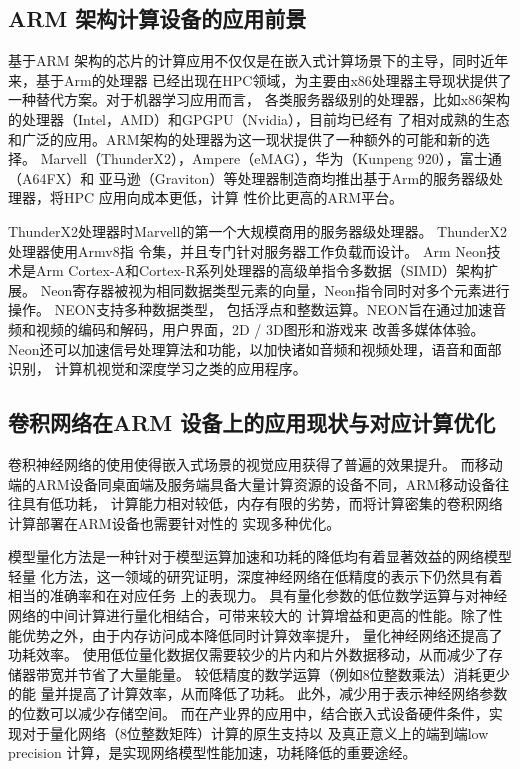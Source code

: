 \subsection{ARM 架构计算设备的应用前景}
基于ARM 架构的芯片的计算应用不仅仅是在嵌入式计算场景下的主导，同时近年来，基于Arm的处理器
已经出现在HPC领域，为主要由x86处理器主导现状提供了一种替代方案。对于机器学习应用而言，
各类服务器级别的处理器，比如x86架构的处理器（Intel，AMD）和GPGPU（Nvidia），目前均已经有
了相对成熟的生态和广泛的应用。ARM架构的处理器为这一现状提供了一种额外的可能和新的选择。
Marvell（ThunderX2），Ampere（eMAG），华为（Kunpeng 920），富士通（A64FX）和
亚马逊（Graviton）等处理器制造商均推出基于Arm的服务器级处理器，将HPC 应用向成本更低，计算
性价比更高的ARM平台。

ThunderX2处理器时Marvell的第一个大规模商用的服务器级处理器。 ThunderX2处理器使用Armv8指
令集，并且专门针对服务器工作负载而设计。 Arm Neon技术是Arm Cortex-A和Cortex-R系列处理器的高级单指令多数据（SIMD）架构扩展。
Neon寄存器被视为相同数据类型元素的向量，Neon指令同时对多个元素进行操作。 NEON支持多种数据类型，
包括浮点和整数运算。NEON旨在通过加速音频和视频的编码和解码，用户界面，2D / 3D图形和游戏来
改善多媒体体验。 Neon还可以加速信号处理算法和功能，以加快诸如音频和视频处理，语音和面部识别，
计算机视觉和深度学习之类的应用程序。

\subsection{卷积网络在ARM 设备上的应用现状与对应计算优化}

卷积神经网络的使用使得嵌入式场景的视觉应用获得了普遍的效果提升。
而移动端的ARM设备同桌面端及服务端具备大量计算资源的设备不同，ARM移动设备往往具有低功耗，
计算能力相对较低，内存有限的劣势，而将计算密集的卷积网络计算部署在ARM设备也需要针对性的
实现多种优化。

模型量化方法是一种针对于模型运算加速和功耗的降低均有着显著效益的网络模型轻量
化方法，这一领域的研究证明，深度神经网络在低精度的表示下仍然具有着相当的准确率和在对应任务
上的表现力。 具有量化参数的低位数学运算与对神经网络的中间计算进行量化相结合，可带来较大的
计算增益和更高的性能。除了性能优势之外，由于内存访问成本降低同时计算效率提升，
量化神经网络还提高了功耗效率。 使用低位量化数据仅需要较少的片内和片外数据移动，从而减少了存
储器带宽并节省了大量能量。 较低精度的数学运算（例如8位整数乘法）消耗更少的能
量并提高了计算效率，从而降低了功耗。 此外，减少用于表示神经网络参数的位数可以减少存储空间。
而在产业界的应用中，结合嵌入式设备硬件条件，实现对于量化网络（8位整数矩阵）计算的原生支持以
及真正意义上的端到端low precision 计算，是实现网络模型性能加速，功耗降低的重要途经。

